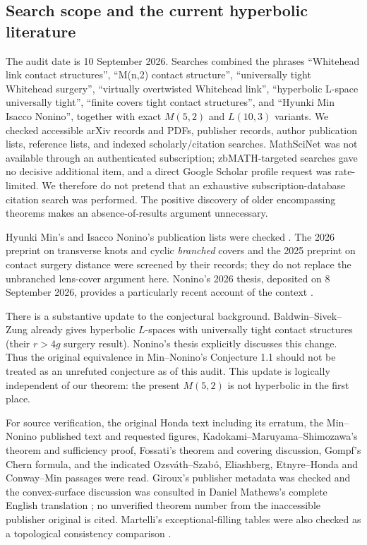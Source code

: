 \documentclass[12pt]{amsart}
\theoremstyle{definition}
\theoremstyle{remark}
\numberwithin{equation}{section}
\theoremstyle{definition}
\begin{document}
\subsection{Search scope and the current hyperbolic literature}
The audit date is 10 September 2026. Searches combined the phrases ``Whitehead link contact structures'', ``M(n,2) contact structure'', ``universally tight Whitehead surgery'', ``virtually overtwisted Whitehead link'', ``hyperbolic L-space universally tight'', ``finite covers tight contact structures'', and ``Hyunki Min Isacco Nonino'', together with exact $M(5,2)$ and $L(10,3)$ variants. We checked accessible arXiv records and PDFs, publisher records, author publication lists, reference lists, and indexed scholarly/citation searches. MathSciNet was not available through an authenticated subscription; zbMATH-targeted searches gave no decisive additional item, and a direct Google Scholar profile request was rate-limited. We therefore do not pretend that an exhaustive subscription-database citation search was performed. The positive discovery of older encompassing theorems makes an absence-of-results argument unnecessary.

Hyunki Min's and Isacco Nonino's publication lists were checked \cite{en-websites}. The 2026 preprint on transverse knots and cyclic \emph{branched} covers and the 2025 preprint on contact surgery distance were screened by their records; they do not replace the unbranched lens-cover argument here. Nonino's 2026 thesis, deposited on 8 September 2026, provides a particularly recent account of the context \cite{en-thesis}.

There is a substantive update to the conjectural background. Baldwin--Sivek--Zung \cite[Theorem 1.4]{en-BSZ} already gives hyperbolic $L$-spaces with universally tight contact structures (their $r>4g$ surgery result). Nonino's thesis explicitly discusses this change. Thus the original equivalence in Min--Nonino's Conjecture 1.1 should not be treated as an unrefuted conjecture as of this audit. This update is logically independent of our theorem: the present $M(5,2)$ is not hyperbolic in the first place.

For source verification, the original Honda text including its erratum, the Min--Nonino published text and requested figures, Kadokami--\allowbreak Maruyama--\allowbreak Shimozawa's theorem and sufficiency proof, Fossati's theorem and covering discussion, Gompf's Chern formula, and the indicated Ozsv\'ath--Szab\'o, Eliashberg, Etnyre--Honda and Conway--Min passages were read. Giroux's publisher metadata was checked and the convex-surface discussion was consulted in Daniel Mathews's complete English translation \cite{en-Giroux}; no unverified theorem number from the inaccessible publisher original is cited. Martelli's exceptional-filling tables were also checked as a topological consistency comparison \cite{en-Martelli}.
\end{document}
